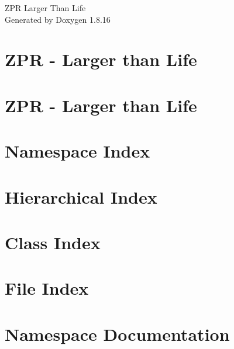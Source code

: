 \let\mypdfximage\pdfximage\def\pdfximage{\immediate\mypdfximage}\documentclass[twoside]{book}
\newcommand{\+}{\discretionary{\mbox{\scriptsize$\hookleftarrow$}}{}{}}
\newcommand{\clearemptydoublepage}{%
  \newpage{\pagestyle{empty}\cleardoublepage}%
}
\begin{document}
\hypersetup{pageanchor=false,
             bookmarksnumbered=true,
             pdfencoding=unicode
            }
\begin{titlepage}
\vspace*{7cm}
\begin{center}%
{\Large Z\+PR Larger Than Life }\\
\vspace*{1cm}
{\large Generated by Doxygen 1.8.16}\\
\end{center}
\end{titlepage}
\clearemptydoublepage
{}
\tableofcontents
\clearemptydoublepage
{}
\hypersetup{pageanchor=true}

\chapter{Z\+PR -\/ Larger than Life}
\label{md_README}

\chapter{Z\+PR -\/ Larger than Life}
\label{md_ZPR-larger-than-life-without_pointers_README}

\chapter{Namespace Index}

\chapter{Hierarchical Index}

\chapter{Class Index}

\chapter{File Index}

\chapter{Namespace Documentation}





\end{document}
